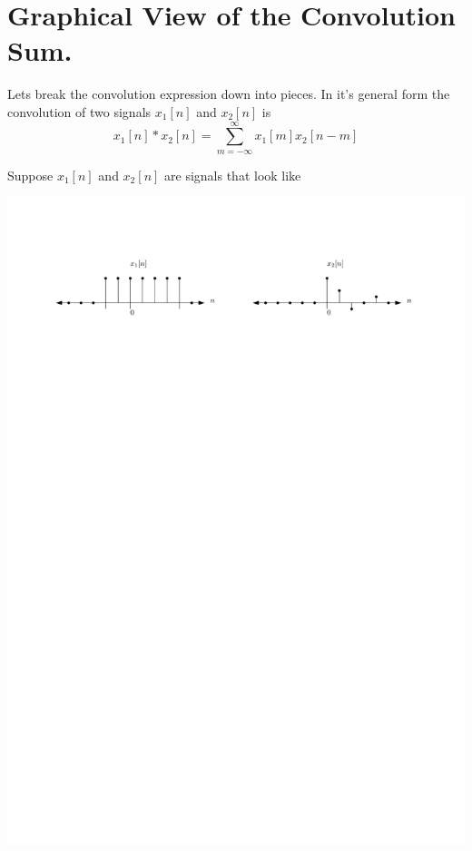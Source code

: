 \section{Graphical View of the Convolution Sum.}

Lets break the convolution expression down into pieces. In it's general form the convolution of two signals $x_1[n]$ and $x_2[n]$ is
\[
x_1[n] * x_2[n] = \sum\limits_{m = -\infty}^{\infty} x_1[m]x_2[n-m]
\]

Suppose $x_1[n]$ and $x_2[n]$ are signals that look like
\begin{center}
  \includegraphics[scale=1]{graphics/dtconvolution-explain1.pdf}
\end{center}

